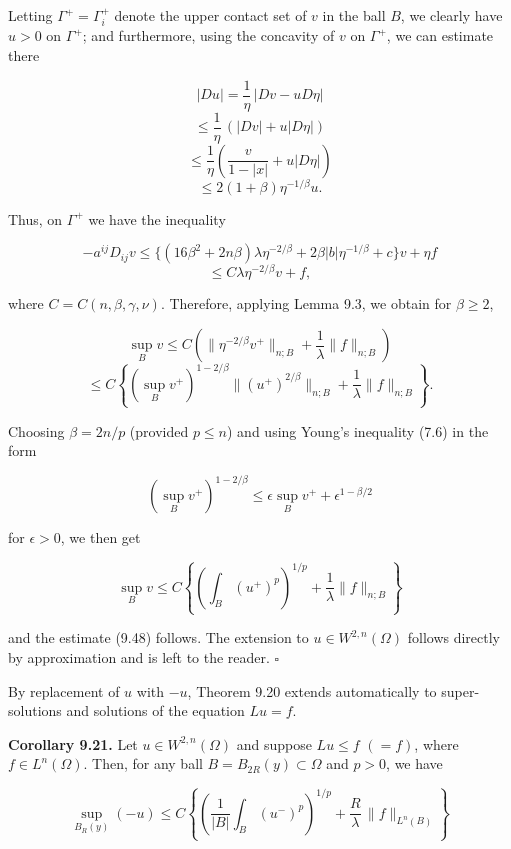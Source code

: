 \noindent Letting $\Gamma^{+} = \Gamma_i^{+}$ denote the upper contact set of $v$ in the ball $B$, we clearly have
$u > 0$ on $\Gamma^{+}$; and furthermore, using the concavity of $v$ on $\Gamma^{+}$, we can estimate
there

\[
|Du| = \frac{1}{\eta}\,|Dv - uD\eta|
\]
\[
\le \frac{1}{\eta}\,(|Dv| + u|D\eta|)
\]
\[
\le \frac{1}{\eta}\left(\frac{v}{1 - |x|} + u|D\eta|\right)
\]
\[
\le 2(1 + \beta)\eta^{-1/\beta}u.
\]

\noindent Thus, on $\Gamma^{+}$ we have the inequality

\[
-a^{ij}D_{ij}v \le \{(16\beta^2 + 2n\beta)\lambda\eta^{-2/\beta} + 2\beta|b|\eta^{-1/\beta} + c\}v + \eta f
\]
\[
\le C\lambda\eta^{-2/\beta}v + f,
\]

\noindent where $C = C(n,\beta,\gamma,\nu)$. Therefore, applying Lemma 9.3, we obtain for $\beta \ge 2$,

\[
\sup_B v \le C\left(\|\eta^{-2/\beta}v^{+}\|_{n;B} + \frac{1}{\lambda}\|f\|_{n;B}\right)
\]
\[
\le C\left\{(\sup_B v^{+})^{1-2/\beta}\|(u^{+})^{2/\beta}\|_{n;B} + \frac{1}{\lambda}\|f\|_{n;B}\right\}.
\]

\noindent Choosing $\beta = 2n/p$ (provided $p \le n$) and using Young's inequality (7.6) in the form

\[
(\sup_B v^{+})^{1-2/\beta} \le \epsilon \sup_B v^{+} + \epsilon^{1-\beta/2}
\]

\noindent for $\epsilon > 0$, we then get

\[
\sup_B v \le C\left\{\left(\int_B (u^{+})^{p}\right)^{1/p} + \frac{1}{\lambda}\|f\|_{n;B}\right\}
\]

\noindent and the estimate (9.48) follows. The extension to $u \in W^{2,n}(\Omega)$ follows directly by
approximation and is left to the reader. $\square$

\medskip

\noindent By replacement of $u$ with $-u$, Theorem 9.20 extends automatically to super-
solutions and solutions of the equation $Lu = f$.





\noindent\textbf{Corollary 9.21.}
Let $u\in W^{2,n}(\Omega)$ and suppose $Lu\le f$ $(=f)$, where $f\in L^n(\Omega)$.
Then, for any ball $B=B_{2R}(y)\subset\Omega$ and $p>0$, we have

\begin{equation}\tag{9.50}
\sup_{B_R(y)}(-u)\le C\left\{\left(\frac{1}{|B|}\int_B (u^-)^p\right)^{1/p}
+\frac{R}{\lambda}\,\|f\|_{L^n(B)}\right\}
\end{equation}

